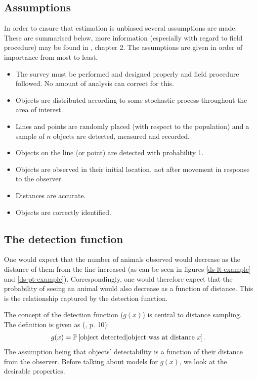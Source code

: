 \subsection{Assumptions}
In order to ensure that estimation is unbiased several assumptions are made. These are summarised below, more information (especially with regard to field procedure) may be found in , chapter 2. The assumptions are given in order of importance from most to least.
\begin{itemize}
	\item The survey must be performed and designed properly and field procedure followed. No amount of analysis can correct for this.
	\item Objects are distributed according to some stochastic process throughout the area of interest.
	\item Lines and points are randomly placed (with respect to the population) and a sample of $n$ objects are detected, measured and recorded.
	\item Objects on the line (or point) are detected with probability 1.
	\item Objects are observed in their initial location, not after movement in response to the observer.
	\item Distances are accurate.
	\item Objects are correctly identified.
\end{itemize}

\subsection{The detection function}
One would expect that the number of animals observed would decrease as the distance of them from the line increased (as can be seen in figures \ref{ds-lt-example} and \ref{ds-pt-example}). Correspondingly, one would therefore expect that the probability of seeing an animal would also decrease as a function of distance. This is the relationship captured by the detection function.

The concept of the detection function ($g(x)$) is central to distance sampling. The definition is given as (\cite{IDS}, p. 10):
\begin{equation*}
g(x)=\mathbb{P}\left[ \text{object detected} | \text{object was at distance } x \right].
\end{equation*}
The assumption being that objects' detectability is a function of their distance from the observer. Before talking about models for $g(x)$, we look at the desirable properties.

